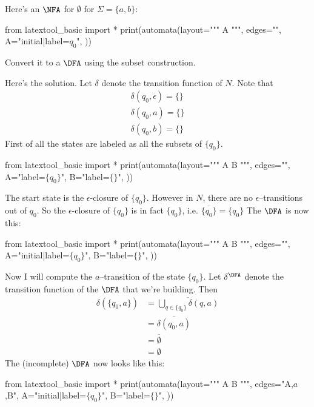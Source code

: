 \newpage
\begin{ex}
Here's an $\NFA$ for $\emptyset$ for $\Sigma = \{a,b\}$:
\begin{python}
from latextool_basic import *
print(automata(layout="""
A
""",
edges="",
A="initial|label=$q_0$",
))
\end{python}
Convert it to a $\DFA$ using the subset construction.
\end{ex}

Here's the solution.
Let $\delta$ denote the transition function of $N$.
Note that 
\begin{align*}
  \delta(q_0, \epsilon) = \{\} \\
  \delta(q_0, a) = \{\} \\
  \delta(q_0, b) = \{\} 
\end{align*}
First of all the states are labeled as all the subsets of $\{q_0\}$.

\begin{python}
from latextool_basic import *
print(automata(layout="""
A  B
""",
edges="",
A="label=$\{q_0\}$",
B="label=$\{\}$",
))
\end{python}

The start state is the $\epsilon$-closure of $\{q_0\}$.
However in $N$, there are no $\epsilon$--transitions out of 
$q_0$.
So the $\epsilon$-closure of $\{q_0\}$ is in fact $\{q_0\}$, i.e.
$\overline{\{q_0\}} = \{q_0\}$
The $\DFA$ is now this:

\begin{python}
from latextool_basic import *
print(automata(layout="""
A  B
""",
edges="",
A="initial|label=$\{q_0\}$",
B="label=$\{\}$",
))
\end{python}

Now I will compute the $a$--transition of the state $\{q_0\}$.
Let $\delta^\DFA$ denote the transition function of the $\DFA$
that we're building.
Then
\begin{align*}
\delta( \{q_0, a\} ) 
&= \overline{ \bigcup_{q \in \{q_0\}} \delta(q, a)} \\
&= \overline{ \delta(q_0, a) } \\
&= \overline{ \emptyset } \\
&= \emptyset
\end{align*}
The (incomplete) $\DFA$ now looks like this:

\begin{python}
from latextool_basic import *
print(automata(layout="""
A  B
""",
edges="A,$a$,B",
A="initial|label=$\{q_0\}$",
B="label=$\{\}$",
))
\end{python}

